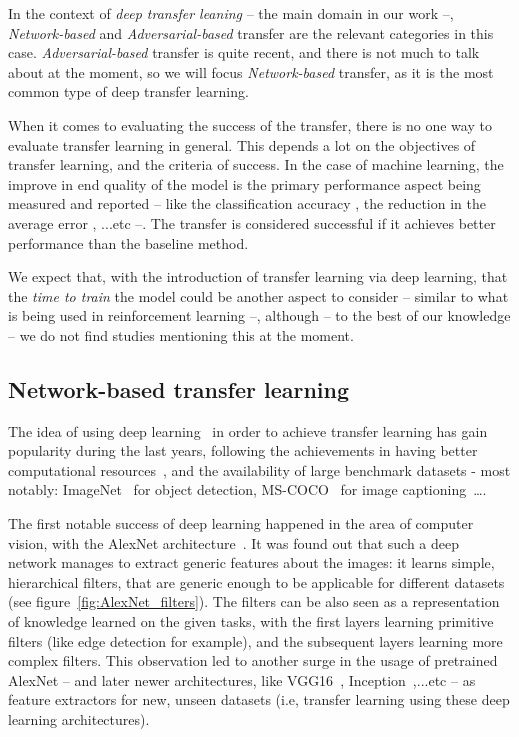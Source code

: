   \par In the context of \textit{deep transfer leaning} -- the main domain in our work --, \textit{Network-based} and \textit{Adversarial-based} transfer are the relevant categories in this case. \textit{Adversarial-based} transfer is quite recent, and there is not much to talk about at the moment, so we will focus \textit{Network-based} transfer, as it is the most common type of deep transfer learning.

  \par When it comes to evaluating the success of the transfer, there is no one way to evaluate transfer learning in general. This depends a lot on the objectives of transfer learning, and the criteria of success. In the case of machine learning, the improve in end quality of the model is the primary performance aspect being measured and reported -- like the classification accuracy \citep{chattopadhyay2012multisource,long2013transfer,pan2010cross,glorot2011domain}, the reduction in the average error \citep{pan2010domain}, ...etc --. The transfer is considered successful if it achieves better performance than the baseline method.

  \par We expect that, with the introduction of transfer learning via deep learning, that the \textit{time to train} the model could be another aspect to consider -- similar to what is being used in reinforcement learning \citep{taylor2007cross} --, although -- to the best of our knowledge -- we do not find studies mentioning this at the moment.

  \subsection{Network-based transfer learning}
    \par The idea of using deep learning~\citep{lecun2015deep} in order to achieve transfer learning has gain popularity during the last years, following the achievements in having better computational resources~\citep{raina2009large}, and the availability of large benchmark datasets - most notably: ImageNet~\citep{imagenet_cvpr09} for object detection, MS-COCO~\citep{2014arXiv1405.0312L} for image captioning~\ldots.

    \par The first notable success of deep learning happened in the area of computer vision, with the AlexNet architecture~\citep{krizhevsky2012imagenet}. It was found out that such a deep network manages to extract generic features about the images: it learns simple, hierarchical filters, that are generic enough to be applicable for different datasets (see figure~\ref{fig:AlexNet_filters}). The filters can be also seen as a representation of knowledge learned on the given tasks, with the first layers learning primitive filters (like edge detection for example), and the subsequent layers learning more complex filters. This observation led to another surge in the usage of pretrained AlexNet -- and later newer architectures, like VGG16~\citep{simonyan2014very}, Inception~\citep{szegedy2015going},...etc -- as feature extractors for new, unseen datasets (i.e, transfer learning using these deep learning architectures).

